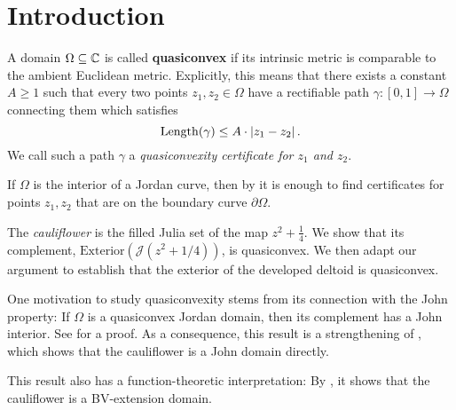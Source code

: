 


\section{Introduction}
A domain $\Omega\subseteq\mathbb{C}$ is called \textbf{quasiconvex }if its
intrinsic metric is comparable to the ambient Euclidean metric. Explicitly,
this means that there exists a constant $A\geq1$ such that every
two points $z_{1},z_{2}\in\Omega$ have a rectifiable path $\gamma:\left[0,1\right]\to\Omega$
connecting them which satisfies
\[
\operatorname{Length}(\gamma)\leq A\cdot\left|z_{1}-z_{2}\right|.
\]
We call such a path $\gamma$ a \emph{quasiconvexity certificate for
$z_{1}$ and $z_{2}$}.

If $\Omega$ is the interior of a Jordan curve, then by \cite[Corollary F]{hakobyan_euclidean_2008}
it is enough to find certificates for points $z_{1},z_{2}$ that are
on the boundary curve $\partial\Omega$.%
\begin{comment}
It is also shown in \cite{hakobyan_euclidean_2008} that any quasidisk is quasiconvex.
\end{comment}

The \emph{cauliflower} is the filled Julia set of the map $z^2+\frac 14$.
We show that its complement, $\mathrm{Exterior}(\mathcal{J}(z^{2}+1/4))$,
is quasiconvex. We then adapt our argument to establish that the exterior of the developed deltoid is quasiconvex.

One motivation to study quasiconvexity stems from its connection with the
John property: If $\Omega$ is a quasiconvex Jordan domain, then its complement has a John interior. See \cite[Corollary 3.4]{hakobyan_euclidean_2008} for a proof.
As a consequence, this result is a strengthening of \cite[Theorem 6.1]{carleson_julia_1994}, which shows that the cauliflower is a John domain directly.

This result also has a function-theoretic interpretation: By \cite[Theorem 1.1]{koskela_geometric_2010}, it shows that the cauliflower is a BV-extension domain.

\begin{comment}
The Filled Julia set of $z^{2}+1/4$, called the cauliflower, has
an inward-pointing cusp and hence is not quasiconvex.
\end{comment}

\begin{comment}
Thus, for any $c$ in 

For values $c$ in quadratic polynomials $f_{c}(z)=z^{2}+c$
\end{comment}
\begin{comment}
If $f_{c}$ has an attracting fixed point then its Julia set $\mathcal{J}(f_{c})$
is a quasicircle, hence its interior and exterior are both quasiconvex.
This is the case for values of $c$ in the main cardioid of the Mandelbrot
set.
, i.e.\ for 
\[
c\in\left\{ -\frac{\lambda}{2}-\frac{\lambda^{2}}{4}:\,\left|\lambda\right|<1\right\} .
\]
\end{comment}

